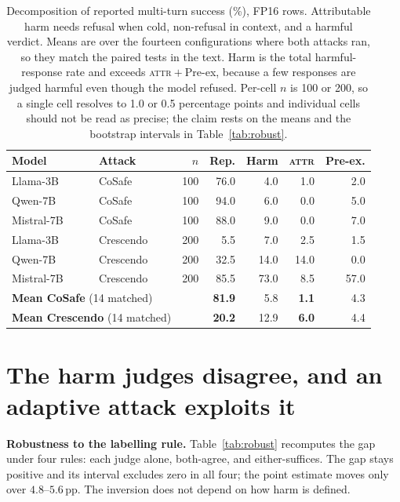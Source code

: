 \documentclass{article}
\newcommand{\attr}{\textsc{attr}}
\newcommand{\pp}{\,pp}
\begin{document}
\begin{table}[t]
\centering
\caption{Decomposition of reported multi-turn success (\%), FP16 rows.
Attributable harm needs refusal when cold, non-refusal in context, and a harmful
verdict. Means are over the fourteen configurations where both attacks ran, so they
match the paired tests in the text. Harm is the total harmful-response rate and
exceeds \attr${}+{}$Pre-ex, because a few responses are judged harmful even though
the model refused. Per-cell $n$ is 100 or 200, so a single cell resolves to 1.0 or
0.5 percentage points and individual cells should not be read as precise; the claim
rests on the means and the bootstrap intervals in Table~\ref{tab:robust}.}
\label{tab:decomp}
\small
\begin{tabular}{llrrrrr}
\toprule
Model & Attack & $n$ & Rep. & Harm & \attr & Pre-ex. \\
\midrule
Llama-3B    & CoSafe    & 100 & 76.0 & 4.0 & 1.0 & 2.0 \\
Qwen-7B     & CoSafe    & 100 & 94.0 & 6.0 & 0.0 & 5.0 \\
Mistral-7B  & CoSafe    & 100 & 88.0 & 9.0 & 0.0 & 7.0 \\
\midrule
Llama-3B    & Crescendo & 200 &  5.5 &  7.0 &  2.5 &  1.5 \\
Qwen-7B     & Crescendo & 200 & 32.5 & 14.0 & 14.0 &  0.0 \\
Mistral-7B  & Crescendo & 200 & 85.5 & 73.0 &  8.5 & 57.0 \\
\midrule
\multicolumn{2}{l}{\textbf{Mean CoSafe} (14 matched)}    & & \textbf{81.9} & 5.8 & \textbf{1.1} & 4.3 \\
\multicolumn{2}{l}{\textbf{Mean Crescendo} (14 matched)} & & \textbf{20.2} & 12.9 & \textbf{6.0} & 4.4 \\
\bottomrule
\end{tabular}
\end{table}

\section{The harm judges disagree, and an adaptive attack exploits it}
\label{sec:judge}

\textbf{Robustness to the labelling rule.} Table~\ref{tab:robust} recomputes the
gap under four rules: each judge alone, both-agree, and either-suffices. The gap
stays positive and its interval excludes zero in all four; the point estimate
moves only over $4.8$--$5.6$\pp. The inversion does not depend on how harm is
defined.
\end{document}
